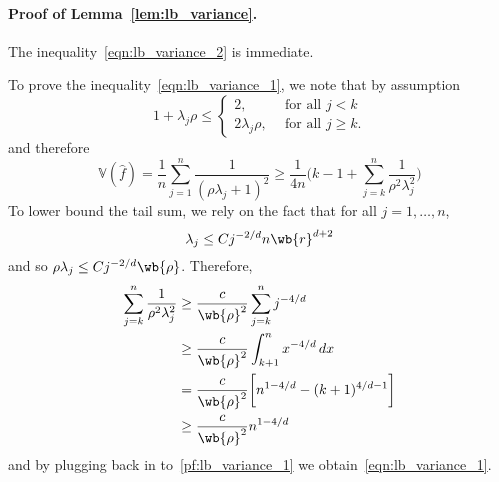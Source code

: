 \documentclass{article}
\newcommand{\1}{\mathbf{1}}
\newcommand{\wh}[1]{\widehat{#1}}
\theoremstyle{definition}
\theoremstyle{remark}
\begin{document}
\paragraph{Proof of Lemma~\ref{lem:lb_variance}.}
The inequality~\eqref{eqn:lb_variance_2} is immediate. 

To prove the inequality~\eqref{eqn:lb_variance_1}, we note that by assumption
\begin{equation*}
1 + \lambda_j\rho \leq 
\begin{cases*}
2,& ~~\textrm{for all $j < k$} \\
2\lambda_j\rho, & ~~\textrm{for all $j \geq k$.}
\end{cases*}
\end{equation*}
and therefore
\begin{equation}
\label{pf:lb_variance_1}
\mathbb{V}(\wh{f}) = \frac{1}{n}\sum_{j = 1}^{n} \frac{1}{(\rho \lambda_j + 1)^2} \geq \frac{1}{4n} \biggl( k - 1 + \sum_{j = k}^{n} \frac{1}{\rho^2 \lambda_j^2} \biggr)
\end{equation}
To lower bound the tail sum, we rely on the fact that for all $j = 1,\ldots,n$,
\begin{equation*}
\lambda_j \leq C j^{-2/d} n\wb{r}^{d + 2}
\end{equation*}
and so $\rho \lambda_j \leq C j^{-2/d} \wb{\rho}$. Therefore,
\begin{align*}
\sum_{j = k}^{n} \frac{1}{\rho^2 \lambda_j^2} & \geq \frac{c}{\wb{\rho}^2} \sum_{j = k}^{n} j^{-4/d} \\
& \geq  \frac{c}{\wb{\rho}^2} \int_{k + 1}^{n} x^{-4/d} \,dx \\
& = \frac{c}{\wb{\rho}^2}\biggl[n^{1 - 4/d} - (k + 1)^{4/d - 1}\biggr] \\
& \geq \frac{c}{\wb{\rho}^2}n^{1 - 4/d}
\end{align*}
and by plugging back in to~\eqref{pf:lb_variance_1} we obtain~\eqref{eqn:lb_variance_1}.
\end{document}
